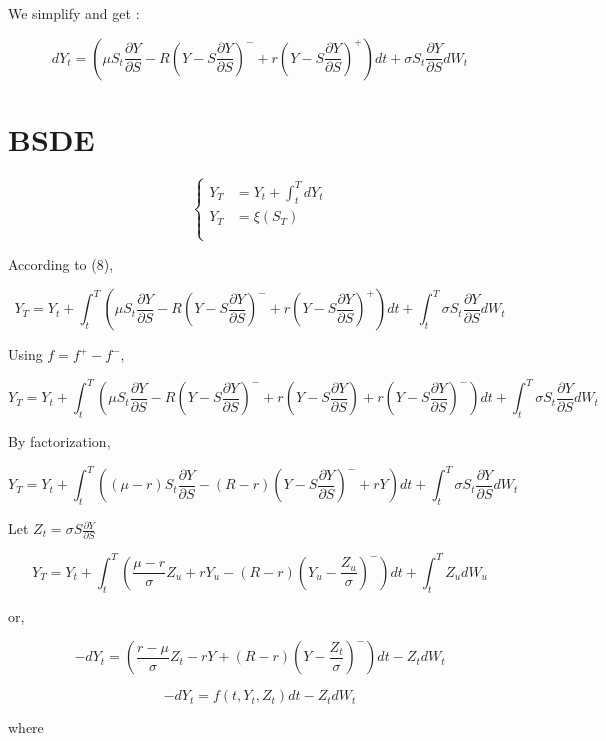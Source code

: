 \documentclass[english,a4paper,12pt,titlepage]{book}
\begin{document}
We simplify and get : 

\begin{equation}
dY_t= (\mu S_t \frac{\partial Y}{\partial S} - R(Y-S\frac{\partial Y}{\partial S})^- + r(Y-S\frac{\partial Y}{\partial S})^+)dt + \sigma S_t \frac{\partial Y}{\partial S}dW_t  
\end{equation}


\section{BSDE}

\[
\left\{
\begin{aligned}
Y_T & =Y_t+\int_{t}^{T}dY_t \\
Y_T & =\xi(S_T)\\
\\
\end{aligned}
\right.
\]



According to (8),

\[Y_T=Y_t+\int_{t}^{T}(\mu S_t \frac{\partial Y}{\partial S} - R(Y-S\frac{\partial Y}{\partial S})^- + r(Y-S\frac{\partial Y}{\partial S})^+)dt + \int_{t}^{T} \sigma S_t \frac{\partial Y}{\partial S}dW_t  \]


Using $f=f^+-f^-$, 

\[Y_T=Y_t+\int_{t}^{T}(\mu S_t \frac{\partial Y}{\partial S} - R(Y-S\frac{\partial Y}{\partial S})^- + r(Y-S\frac{\partial Y}{\partial S}) + r(Y-S\frac{\partial Y}{\partial S})^-)dt + \int_{t}^{T} \sigma S_t \frac{\partial Y}{\partial S}dW_t  \]


By factorization, 


\[Y_T=Y_t+\int_{t}^{T}((\mu-r) S_t \frac{\partial Y}{\partial S} - (R-r)(Y-S\frac{\partial Y}{\partial S})^- + rY )dt + \int_{t}^{T} \sigma S_t \frac{\partial Y}{\partial S}dW_t  \]

Let $Z_t=\sigma S\frac{\partial Y}{\partial S}$

\[Y_T=Y_t+\int_{t}^{T}(\frac{\mu -r}{\sigma} Z_u + rY_u - (R-r)(Y_u-\frac{Z_u}{\sigma})^-  )dt + \int_{t}^{T} Z_udW_u  \]

or, 

\[-dY_t=(\frac{r-\mu}{\sigma} Z_t - rY + (R-r)(Y-\frac{Z_t}{\sigma})^-  )dt - Z_tdW_t  \]

\begin{equation}
-dY_t=f(t,Y_t,Z_t)dt - Z_tdW_t  
\end{equation}

where 
\end{document}
